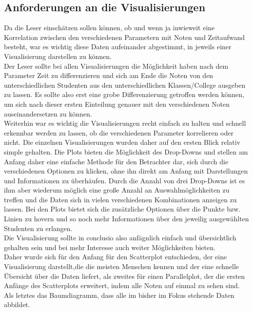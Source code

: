 \documentclass[usegeometry=true]{scrartcl}
\begin{document}
\subsection{Anforderungen an die Visualisierungen}
\label{Anforderungen}
\noindent Da die Leser einschätzen sollen können, ob und wenn ja inwieweit eine Korrelation zwischen den verschiedenen Parametern mit Noten und Zeitaufwand besteht, war es wichtig diese Daten aufeinander abgestimmt, in jeweils einer Visualisierung darstellen zu können.\\

\noindent Der Leser sollte bei allen Visualisierungen die Möglichkeit haben nach dem Parameter Zeit zu differenzieren und sich am Ende die Noten von den unterschiedlichen Studenten aus den unterschiedlichen Klassen/College ausgeben zu lassen. Es sollte also erst eine grobe Differenzierung getroffen werden können, um sich nach dieser ersten Einteilung genauer mit den verschiedenen Noten auseinandersetzen zu können.\\

\noindent Weiterhin war es wichtig die Visualisierungen recht einfach zu halten und schnell erkennbar werden zu lassen, ob die verschiedenen Parameter korrelieren oder nicht. 
\noindent Die einzelnen Visualisierungen wurden daher auf den ersten Blick relativ simple gehalten. Die Plots bieten die Möglichkeit des Drop-Downs und stellen am Anfang daher eine einfache Methode für den Betrachter dar, sich durch die verschiedenen Optionen zu klicken, ohne ihn direkt am Anfang mit Darstellungen und Informationen zu überhäufen. Durch die Anzahl von drei Drop-Downs ist es ihm aber wiederum möglich eine große Anzahl an Auswahlmöglichkeiten zu treffen und die Daten sich in vielen verschiedenen Kombinationen anzeigen zu lassen. Bei den Plots bietet sich die zusätzliche Optionen über die Punkte bzw. Linien zu hovern und so noch mehr Informationen über den jeweilig ausgewählten Studenten zu erlangen.\\

\noindent Die Visualisierung sollte in conclusio also anfägnlich einfach und übersichtlich gehalten sein und bei mehr Interesse auch weiter Möglichkeiten bieten.\\

\noindent Daher wurde sich für den Anfang für den Scatterplot entschieden, der eine Visualisierung darstellt,die die meisten Menschen kennen und der eine schnelle Übersicht über die Daten liefert, als zweites für einen Parallelplot, der die ersten Anfänge des Scatterplots erweitert, indem alle Noten auf einmal zu sehen sind. Als letztes das Baumdiagramm, dass alle im bisher im Fokus stehende Daten abbildet. 
\end{document}
